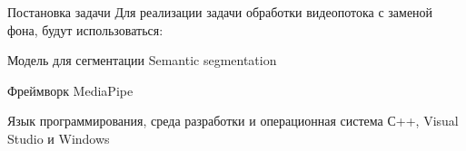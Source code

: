 \documentclass[aspectratio=169,xcolor=dvipsnames]{beamer}
\begin{document}

\begin{frame}{Постановка задачи}
    Для реализации задачи обработки видеопотока с заменой фона, будут использоваться:

    \begin{block}{Модель для сегментации}
        Semantic segmentation
    \end{block}

    \begin{block}{Фреймворк}
        MediaPipe
    \end{block}

    \begin{block}{Язык программирования, среда разработки и операционная система}
        С++, Visual Studio и Windows
    \end{block}
\end{frame}

\end{document}
